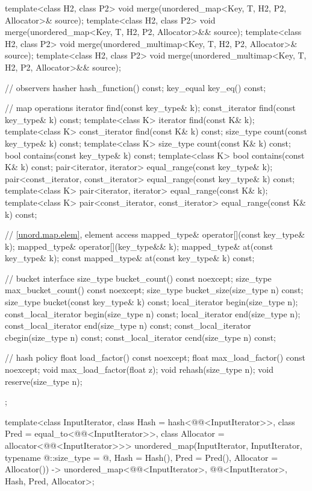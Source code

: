 \begin{codeblock}
{{    template<class H2, class P2>
      void merge(unordered_map<Key, T, H2, P2, Allocator>& source);
    template<class H2, class P2>
      void merge(unordered_map<Key, T, H2, P2, Allocator>&& source);
    template<class H2, class P2>
      void merge(unordered_multimap<Key, T, H2, P2, Allocator>& source);
    template<class H2, class P2>
      void merge(unordered_multimap<Key, T, H2, P2, Allocator>&& source);

    // observers
    hasher hash_function() const;
    key_equal key_eq() const;

    // map operations
    iterator         find(const key_type& k);
    const_iterator   find(const key_type& k) const;
    template<class K>
      iterator       find(const K& k);
    template<class K>
      const_iterator find(const K& k) const;
    size_type        count(const key_type& k) const;
    template<class K>
      size_type      count(const K& k) const;
    bool             contains(const key_type& k) const;
    template<class K>
      bool           contains(const K& k) const;
    pair<iterator, iterator>               equal_range(const key_type& k);
    pair<const_iterator, const_iterator>   equal_range(const key_type& k) const;
    template<class K>
      pair<iterator, iterator>             equal_range(const K& k);
    template<class K>
      pair<const_iterator, const_iterator> equal_range(const K& k) const;

    // \ref{unord.map.elem}, element access
    mapped_type& operator[](const key_type& k);
    mapped_type& operator[](key_type&& k);
    mapped_type& at(const key_type& k);
    const mapped_type& at(const key_type& k) const;

    // bucket interface
    size_type bucket_count() const noexcept;
    size_type max_bucket_count() const noexcept;
    size_type bucket_size(size_type n) const;
    size_type bucket(const key_type& k) const;
    local_iterator begin(size_type n);
    const_local_iterator begin(size_type n) const;
    local_iterator end(size_type n);
    const_local_iterator end(size_type n) const;
    const_local_iterator cbegin(size_type n) const;
    const_local_iterator cend(size_type n) const;

    // hash policy
    float load_factor() const noexcept;
    float max_load_factor() const noexcept;
    void max_load_factor(float z);
    void rehash(size_type n);
    void reserve(size_type n);
  };

  template<class InputIterator,
           class Hash = hash<@@<InputIterator>>,
           class Pred = equal_to<@@<InputIterator>>,
           class Allocator = allocator<@@<InputIterator>>>
    unordered_map(InputIterator, InputIterator, typename @\seebelow@::size_type = @\seebelow@,
                  Hash = Hash(), Pred = Pred(), Allocator = Allocator())
      -> unordered_map<@@<InputIterator>, @@<InputIterator>, Hash, Pred,
                       Allocator>;

}
\end{codeblock}
